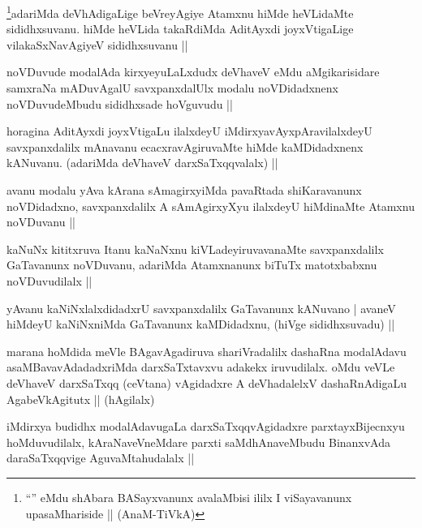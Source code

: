 \begin{artha}
\footnote{``\stext'' eMdu shAbara BASayxvanunx avalaMbisi ililx I viSayavanunx upasaMhariside || (AnaM-TiVkA)}adariMda deVhAdigaLige beVreyAgiye Atamxnu hiMde heVLidaMte sididhxsuvanu. hiMde heVLida takaRdiMda AditAyxdi joyxVtigaLige  vilakaSxNavAgiyeV sididhxsuvanu ||
\end{artha}

\begin{artha}
noVDuvude modalAda kirxyeyuLaLxdudx deVhaveV eMdu aMgikarisidare samxraNa mADuvAgalU savxpanxdalUlx modalu noVDidadxnenx noVDuvudeMbudu sididhxsade hoVguvudu ||
\end{artha}

\begin{artha}
horagina AditAyxdi joyxVtigaLu ilalxdeyU iMdirxyavAyxpAravilalxdeyU savxpanxdalilx mAnavanu ecacxravAgiruvaMte hiMde kaMDidadxnenx kANuvanu. (adariMda deVhaveV darxSaTxqqvalalx) ||
\end{artha}

\begin{artha}
avanu modalu yAva kArana sAmagirxyiMda pavaRtada shiKaravanunx noVDidadxno, savxpanxdalilx A sAmAgirxyXyu ilalxdeyU hiMdinaMte Atamxnu noVDuvanu ||
\end{artha}

\begin{artha}
kaNuNx kititxruva Itanu kaNaNxnu kiVLadeyiruvavanaMte savxpanxdalilx GaTavanunx noVDuvanu, adariMda Atamxnanunx biTuTx matotxbabxnu noVDuvudilalx ||
\end{artha}

\begin{artha}
yAvanu kaNiNxlalxdidadxrU savxpanxdalilx GaTavanunx kANuvano | avaneV hiMdeyU kaNiNxniMda GaTavanunx kaMDidadxnu, (hiVge sididhxsuvadu) ||
\end{artha}

\begin{artha}
marana hoMdida meVle BAgavAgadiruva shariVradalilx dashaRna modalAdavu asaMBavavAdadadxriMda darxSaTxtavxvu adakekx iruvudilalx. oMdu veVLe deVhaveV darxSaTxqq (ceVtana) vAgidadxre A deVhadalelxV dashaRnAdigaLu AgabeVkAgitutx || (hAgilalx)
\end{artha}

\begin{artha}
iMdirxya budidhx modalAdavugaLa darxSaTxqqvAgidadxre parxtayxBijecnxyu hoMduvudilalx, kAraNaveVneMdare parxti saMdhAnaveMbudu BinanxvAda daraSaTxqqvige AguvaMtahudalalx ||
\end{artha}

